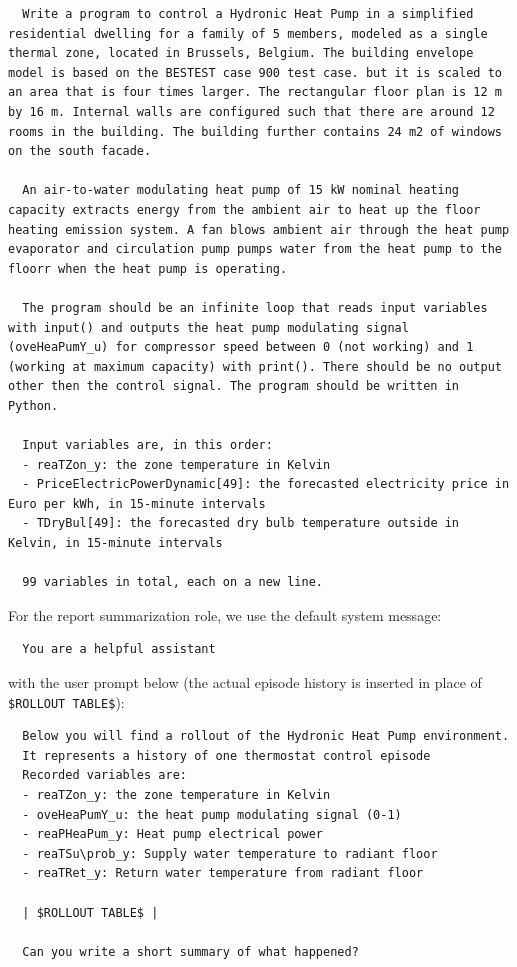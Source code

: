 \begin{lstlisting}
  Write a program to control a Hydronic Heat Pump in a simplified residential dwelling for a family of 5 members, modeled as a single thermal zone, located in Brussels, Belgium. The building envelope model is based on the BESTEST case 900 test case. but it is scaled to an area that is four times larger. The rectangular floor plan is 12 m by 16 m. Internal walls are configured such that there are around 12 rooms in the building. The building further contains 24 m2 of windows on the south facade.

  An air-to-water modulating heat pump of 15 kW nominal heating capacity extracts energy from the ambient air to heat up the floor heating emission system. A fan blows ambient air through the heat pump evaporator and circulation pump pumps water from the heat pump to the floorr when the heat pump is operating. 
  
  The program should be an infinite loop that reads input variables with input() and outputs the heat pump modulating signal (oveHeaPumY_u) for compressor speed between 0 (not working) and 1 (working at maximum capacity) with print(). There should be no output other then the control signal. The program should be written in Python.
  
  Input variables are, in this order:
  - reaTZon_y: the zone temperature in Kelvin
  - PriceElectricPowerDynamic[49]: the forecasted electricity price in Euro per kWh, in 15-minute intervals
  - TDryBul[49]: the forecasted dry bulb temperature outside in Kelvin, in 15-minute intervals

  99 variables in total, each on a new line.
\end{lstlisting}

For the report summarization role, we use the default system message:

\begin{lstlisting}
  You are a helpful assistant
\end{lstlisting}

with the user prompt below (the actual episode history is inserted in place of \verb|$ROLLOUT TABLE$|):

\begin{lstlisting}
  Below you will find a rollout of the Hydronic Heat Pump environment.
  It represents a history of one thermostat control episode
  Recorded variables are:
  - reaTZon_y: the zone temperature in Kelvin
  - oveHeaPumY_u: the heat pump modulating signal (0-1)
  - reaPHeaPum_y: Heat pump electrical power
  - reaTSu\prob_y: Supply water temperature to radiant floor
  - reaTRet_y: Return water temperature from radiant floor

  | $ROLLOUT TABLE$ |

  Can you write a short summary of what happened?
\end{lstlisting}

